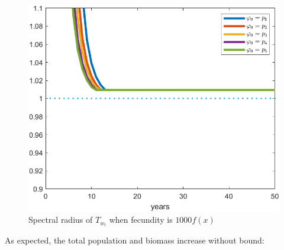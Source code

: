 \begin{figure}[H]
	\centering
	\includegraphics[width=0.6\linewidth]{Images/F=1000/spectral_radius_when_f=1000}
	\caption{Spectral radius of $T_{w_t}$ when fecundity is $1000f(x)$}
	\label{fig:spectralradiuswhenf=1000}
\end{figure}

As expected, the total population and biomass increase without bound:

